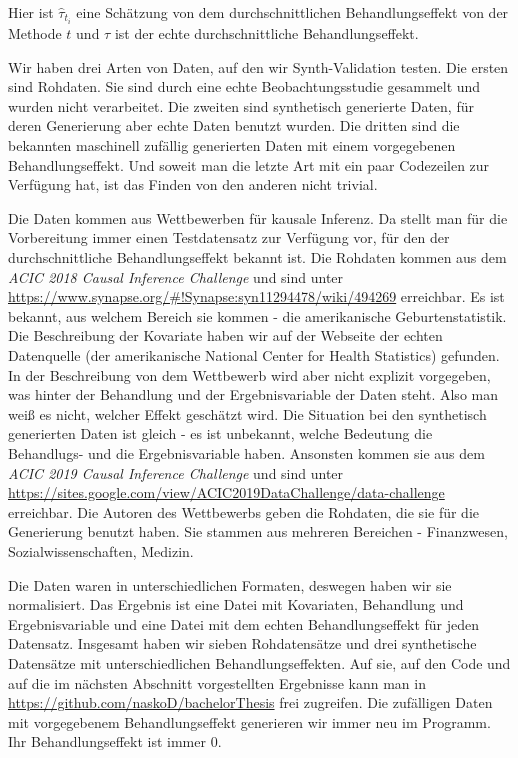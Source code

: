 \documentclass[12pt,a4paper,twoside]{scrartcl}
\numberwithin{equation}{section}
\begin{document}
\noindent
Hier ist $\hat{\tau}_{t_i}$ eine Schätzung von dem durchschnittlichen Behandlungseffekt von der Methode $t$ und $\tau$ ist der echte durchschnittliche Behandlungseffekt.\par

\noindent
Wir haben drei Arten von Daten, auf den wir Synth-Validation testen. Die ersten sind Rohdaten. Sie sind durch eine echte Beobachtungsstudie gesammelt und wurden nicht verarbeitet. Die zweiten sind synthetisch generierte Daten, für deren Generierung aber echte Daten benutzt wurden. Die dritten sind die bekannten maschinell zufällig generierten Daten mit einem vorgegebenen Behandlungseffekt. Und soweit man die letzte Art mit ein paar Codezeilen zur Verfügung hat, ist das Finden von den anderen nicht trivial.\par 

\noindent
Die Daten kommen aus Wettbewerben für kausale Inferenz. Da stellt man für die Vorbereitung immer einen Testdatensatz zur Verfügung vor, für den der durchschnittliche Behandlungseffekt bekannt ist. Die Rohdaten kommen aus dem \emph{ACIC 2018 Causal Inference Challenge} und sind unter \url{https://www.synapse.org/#!Synapse:syn11294478/wiki/494269} erreichbar. Es ist bekannt, aus welchem Bereich sie kommen - die amerikanische Geburtenstatistik. Die Beschreibung der Kovariate haben wir auf der Webseite der echten Datenquelle (der amerikanische National Center for Health Statistics) gefunden. In der Beschreibung von dem Wettbewerb wird aber nicht explizit vorgegeben, was hinter der Behandlung und der Ergebnisvariable der Daten steht. Also man weiß es nicht, welcher Effekt geschätzt wird. Die Situation bei den synthetisch generierten Daten ist gleich - es ist unbekannt, welche Bedeutung die Behandlugs- und die Ergebnisvariable haben. Ansonsten kommen sie aus dem \emph{ACIC 2019 Causal Inference Challenge} und sind unter \url{https://sites.google.com/view/ACIC2019DataChallenge/data-challenge} erreichbar. Die Autoren des Wettbewerbs geben die Rohdaten, die sie für die Generierung benutzt haben. Sie stammen aus mehreren Bereichen - Finanzwesen, Sozialwissenschaften, Medizin.\par   

\noindent
Die Daten waren in unterschiedlichen Formaten, deswegen haben wir sie normalisiert. Das Ergebnis ist eine Datei mit Kovariaten, Behandlung und Ergebnisvariable und eine Datei mit dem echten Behandlungseffekt für jeden Datensatz. Insgesamt haben wir sieben Rohdatensätze und drei synthetische Datensätze mit unterschiedlichen Behandlungseffekten. Auf sie, auf den Code und auf die im nächsten Abschnitt vorgestellten Ergebnisse kann man in \url{https://github.com/naskoD/bachelorThesis} frei zugreifen. Die zufälligen Daten mit vorgegebenem  Behandlungseffekt generieren wir immer neu im Programm. Ihr Behandlungseffekt ist immer 0.\par
\end{document}
